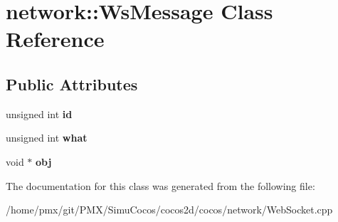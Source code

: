 \hypertarget{classnetwork_1_1WsMessage}{}\section{network\+:\+:Ws\+Message Class Reference}
\label{classnetwork_1_1WsMessage}
\subsection*{Public Attributes}
\begin{DoxyCompactItemize}
\item 
\mbox{\label{classnetwork_1_1WsMessage_a58c1b87de7b3c15621142c2476229c82}} 
unsigned int {\bfseries id}
\item 
\mbox{\label{classnetwork_1_1WsMessage_a3f8b329a6df7bf978abeae8c90b5149d}} 
unsigned int {\bfseries what}
\item 
\mbox{\label{classnetwork_1_1WsMessage_add9e8093fb833cc2556ae054b9c2fbfa}} 
void $\ast$ {\bfseries obj}
\end{DoxyCompactItemize}


The documentation for this class was generated from the following file\+:\begin{DoxyCompactItemize}
\item 
/home/pmx/git/\+P\+M\+X/\+Simu\+Cocos/cocos2d/cocos/network/Web\+Socket.\+cpp\end{DoxyCompactItemize}
